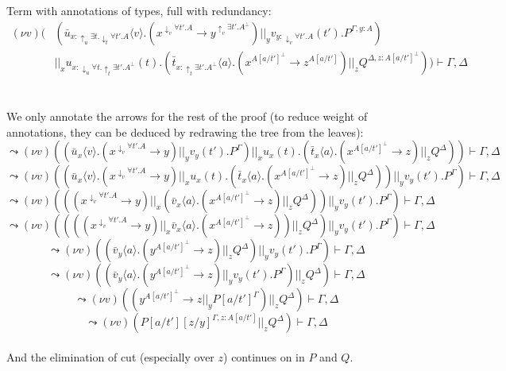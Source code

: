 \documentclass[a4paper,12pt]{article}
\begin{document}
~\\~\\
Term with annotations of types, full with redundancy:
\begin{align*}
(\nu v)( & \left(\bar{u}_{x:\uparrow_u\exists t.\downarrow_t\forall t'.A}\langle v\rangle.(x^{\downarrow_v\forall t'.A}\to y^{\uparrow_v\exists t'.A^\bot}) ||_y v_{y:\downarrow_v\forall t'.A}(t').P^{\Gamma, y:A}\right)\\
& ||_x u_{x:\downarrow_u\forall t.\uparrow_t\exists t'.A^\bot}(t).\left(\bar{t}_{x:\uparrow_t\exists t'.A^\bot}\langle a\rangle.(x^{A[a/t']^\bot}\to z^{A[a/t']}) ||_z Q^{\Delta,z:A[a/t']^\bot}\right)) \vdash \Gamma,\Delta
\end{align*}
~\\~\\
We only annotate the arrows for the rest of the proof (to reduce weight of annotations, they can be deduced by redrawing the tree from the leaves):\\
\[\leadsto (\nu v)((\bar{u}_x\langle v\rangle.(x^{\downarrow_v\forall t'.A}\to y) ||_y v_y(t').P^\Gamma) ||_x u_x(t).(\bar{t}_x\langle a\rangle.(x^{A[a/t']^\bot}\to z) ||_z Q^\Delta)) \vdash \Gamma,\Delta\]
\[\leadsto (\nu v)((\bar{u}_x\langle v\rangle.(x^{\downarrow_v\forall t'.A}\to y) ||_x u_x(t).(\bar{t}_x\langle a\rangle.(x^{A[a/t']^\bot}\to z) ||_z Q^\Delta)) ||_y v_y(t').P^\Gamma) \vdash \Gamma,\Delta\]
\[\leadsto (\nu v)(((x^{\downarrow_v\forall t'.A}\to y) ||_x (\bar{v}_x\langle a\rangle.(x^{A[a/t']^\bot}\to z) ||_z Q^\Delta)) ||_y v_y(t').P^\Gamma) \vdash \Gamma,\Delta\]
\[\leadsto (\nu v)((((x^{\downarrow_v\forall t'.A}\to y) ||_x \bar{v}_x\langle a\rangle.(x^{A[a/t']^\bot}\to z)) ||_z Q^\Delta) ||_y v_y(t').P^\Gamma) \vdash \Gamma,\Delta\]
\[\leadsto (\nu v)((\bar{v}_y\langle a\rangle.(y^{A[a/t']^\bot}\to z) ||_z Q^\Delta) ||_y v_y(t').P^\Gamma) \vdash \Gamma,\Delta\]
\[\leadsto (\nu v)((\bar{v}_y\langle a\rangle.(y^{A[a/t']^\bot}\to z) ||_y v_y(t').P^\Gamma) ||_z Q^\Delta) \vdash \Gamma,\Delta\]
\[\leadsto (\nu v)((y^{A[a/t']^\bot}\to z ||_y P[a/t']^\Gamma) ||_z Q^\Delta) \vdash \Gamma,\Delta\]
\[\leadsto (\nu v)(P[a/t'][z/y]^{\Gamma,z:A[a/t']} ||_z Q^\Delta) \vdash \Gamma,\Delta\]~\\
And the elimination of cut (especially over $z$) continues on in $P$ and $Q$.
\end{document}
